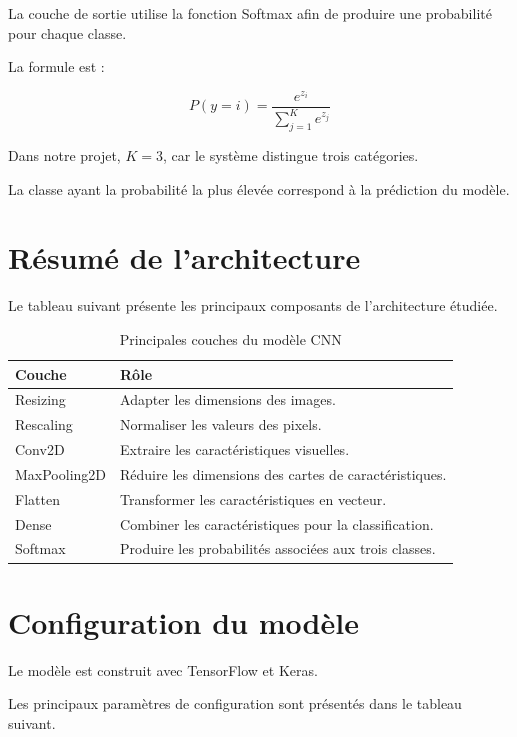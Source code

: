 \documentclass[12pt,a4paper,oneside]{report}
\begin{document}
La couche de sortie utilise la fonction Softmax afin
de produire une probabilité pour chaque classe.

La formule est :

\[
P(y=i)=\frac{e^{z_i}}{\sum_{j=1}^{K}e^{z_j}}
\]

Dans notre projet, $K=3$, car le système distingue
trois catégories.

La classe ayant la probabilité la plus élevée
correspond à la prédiction du modèle.

\section{Résumé de l'architecture}

Le tableau suivant présente les principaux composants
de l'architecture étudiée.

\begin{table}[H]
\centering
\caption{Principales couches du modèle CNN}
\begin{tabularx}{\textwidth}{p{3.5cm}X}
\toprule
\textbf{Couche} & \textbf{Rôle}\\
\midrule
Resizing &
Adapter les dimensions des images.\\

Rescaling &
Normaliser les valeurs des pixels.\\

Conv2D &
Extraire les caractéristiques visuelles.\\

MaxPooling2D &
Réduire les dimensions des cartes de caractéristiques.\\

Flatten &
Transformer les caractéristiques en vecteur.\\

Dense &
Combiner les caractéristiques pour la classification.\\

Softmax &
Produire les probabilités associées aux trois classes.\\
\bottomrule
\end{tabularx}
\end{table}

\section{Configuration du modèle}

Le modèle est construit avec TensorFlow et Keras.

Les principaux paramètres de configuration sont présentés
dans le tableau suivant.
\end{document}
